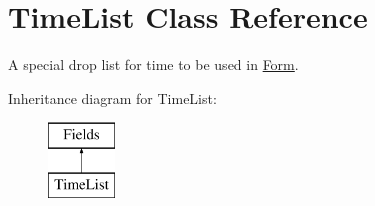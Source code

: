 \hypertarget{class_time_list}{\section{Time\-List Class Reference}
\label{class_time_list}
}


A special drop list for time to be used in \hyperlink{class_form}{Form}.  


Inheritance diagram for Time\-List\-:\begin{figure}[H]
\begin{center}
\leavevmode
\includegraphics[height=2.000000cm]{class_time_list}
\end{center}
\end{figure}
